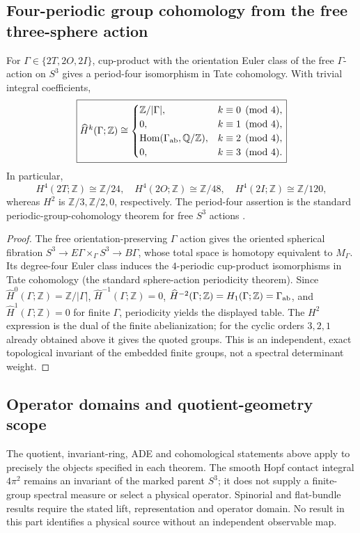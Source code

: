 \documentclass[11pt]{article}
\begin{document}
\subsection{Four-periodic group cohomology from the free three-sphere action}
\label{p1b:subsec:v12-four-periodic}

\begin{theorem}
\label{p1b:thm:v12-periodic-cohomology}
For $\Gamma\in\{2T,2O,2I\}$, cup-product with the orientation
Euler class of the free $\Gamma$-action on $S^3$ gives a period-four
isomorphism in Tate cohomology.  With trivial integral coefficients,
\[
\boxed{
\widehat H^k(\Gamma;\mathbb Z)\cong
\begin{cases}
\mathbb Z/|\Gamma|,&k\equiv0\pmod4,\\
0,&k\equiv1\pmod4,\\
\operatorname{Hom}(\Gamma_{\rm ab},\mathbb Q/\mathbb Z),
  &k\equiv2\pmod4,\\
0,&k\equiv3\pmod4.
\end{cases}}
\]
In particular,
\[
H^4(2T;\mathbb Z)\cong\mathbb Z/24,\quad
H^4(2O;\mathbb Z)\cong\mathbb Z/48,\quad
H^4(2I;\mathbb Z)\cong\mathbb Z/120,
\]
whereas $H^2$ is $\mathbb Z/3,\mathbb Z/2,0$, respectively.
The period-four assertion is the standard periodic-group-cohomology
theorem for free $S^3$ actions
\cite{Nicholson2024SwanCancellation}.
\end{theorem}
\begin{proof}
The free orientation-preserving $\Gamma$ action gives the
oriented spherical fibration
$S^3\to E\Gamma\times_\Gamma S^3\to B\Gamma$,
whose total space is homotopy equivalent to $M_\Gamma$.
Its degree-four Euler class induces the $4$-periodic cup-product
isomorphisms in Tate cohomology (the standard sphere-action
periodicity theorem).  Since
$\widehat H^0(\Gamma;\mathbb Z)=\mathbb Z/|\Gamma|$,
$\widehat H^{-1}(\Gamma;\mathbb Z)=0$,
$\widehat H^{-2}(\Gamma;\mathbb Z)=H_1(\Gamma;\mathbb Z)=\Gamma_{\rm ab}$,
and $\widehat H^1(\Gamma;\mathbb Z)=0$ for finite $\Gamma$,
periodicity yields the displayed table.
The $H^2$ expression is the dual of the finite abelianization;
for the cyclic orders $3,2,1$ already obtained above it gives the
quoted groups.  This is an independent, exact topological invariant
of the embedded finite groups, not a spectral determinant weight.
\end{proof}

\subsection{Operator domains and quotient-geometry scope}
\label{p1b:subsec:v12-frontiers}
The quotient, invariant-ring, ADE and cohomological statements above apply to
precisely the objects specified in each theorem.  The smooth Hopf contact
integral $4\pi^2$ remains an invariant of the marked parent $S^3$; it does
not supply a finite-group spectral measure or select a physical operator.
Spinorial and flat-bundle results require the stated lift, representation and
operator domain.  No result in this part identifies a physical source without
an independent observable map.
\end{document}
